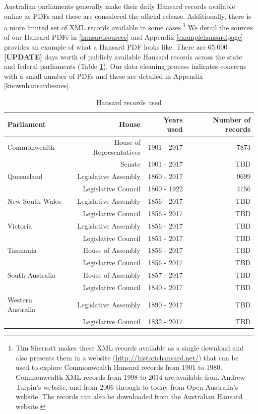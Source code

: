 \documentclass[12pt,]{article}
\theoremstyle{definition}
\theoremstyle{definition}
\theoremstyle{definition}
\theoremstyle{remark}
\begin{document}
Australian parliaments generally make their daily Hansard records
available online as PDFs and these are considered the official release.
Additionally, there is a more limited set of XML records available in
some cases.\footnote{Tim Sherratt makes these XML records available as a
  single download and also presents them in a website
  (\url{http://historichansard.net/}) that can be used to explore
  Commonwealth Hansard records from 1901 to 1980. Commonwealth XML
  records from 1998 to 2014 are available from Andrew Turpin's website,
  and from 2006 through to today from Open Australia's website. The
  records can also be downloaded from the Australian Hansard website.}
We detail the sources of our Hansard PDFs in \ref{hansardsources} and
Appendix \ref{examplehansardpage} provides an example of what a Hansard
PDF looks like. There are 65,000 \textbf{{[}UPDATE{]}} days worth of
publicly available Hansard records across the state and federal
parliaments (Table \ref{tab:yearsusedtable}). Our data cleaning process
indicates concerns with a small number of PDFs and these are detailed in
Appendix \ref{knownhansardissues}.

\begin{table}

\caption{\label{tab:yearsusedtable}Hansard records used}
\centering
\fontsize{12}{14}\selectfont
\begin{tabular}[t]{lrrr}
\toprule
Parliament & House & Years used & Number of records\\
\midrule
Commonwealth & House of Representatives & 1901 - 2017 & 7873\\
 & Senate & 1901 - 2017 & TBD\\
Queensland & Legislative Assembly & 1860 - 2017 & 9699\\
 & Legislative Council & 1860 - 1922 & 4156\\
New South Wales & Legislative Assembly & 1856 - 2017 & TBD\\
\addlinespace
 & Legislative Council & 1856 - 2017 & TBD\\
Victoria & Legislative Assembly & 1856 - 2017 & TBD\\
 & Legislative Council & 1851 - 2017 & TBD\\
Tasmania & House of Assembly & 1856 - 2017 & TBD\\
 & Legislative Council & 1856 - 2017 & TBD\\
\addlinespace
South Australia & House of Assembly & 1857 - 2017 & TBD\\
 & Legislative Council & 1840 - 2017 & TBD\\
Western Australia & Legislative Assembly & 1890 - 2017 & TBD\\
 & Legislative Council & 1832 - 2017 & TBD\\
\bottomrule
\end{tabular}
\end{table}
\end{document}
